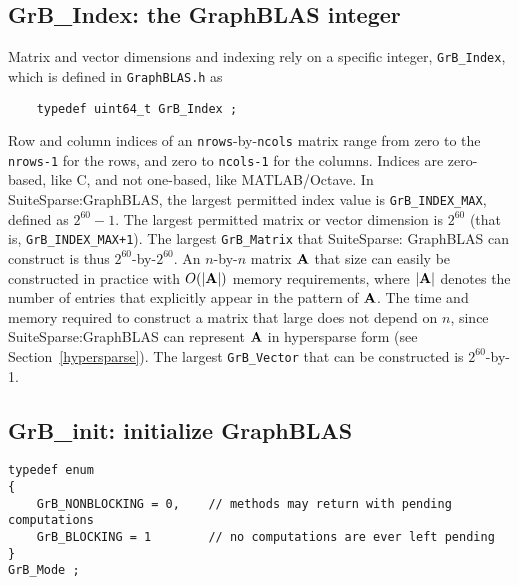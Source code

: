 \documentclass[12pt]{article}
\begin{document}
\subsection{{\sf GrB\_Index:} the GraphBLAS integer} %
\label{grbindex}

Matrix and vector dimensions and indexing rely on a specific integer,
\verb'GrB_Index', which is defined in \verb'GraphBLAS.h' as

    {\footnotesize
    \begin{verbatim}
    typedef uint64_t GrB_Index ; \end{verbatim}}

Row and column indices of an \verb'nrows'-by-\verb'ncols' matrix range from
zero to the \verb'nrows-1' for the rows, and zero to \verb'ncols-1' for the
columns.  Indices are zero-based, like C, and not one-based, like
MATLAB/Octave.  In SuiteSparse:GraphBLAS, the largest permitted index value
is \verb'GrB_INDEX_MAX', defined as $2^{60}-1$.  The largest permitted
matrix or vector dimension is $2^{60}$ (that is, \verb'GrB_INDEX_MAX+1').
The largest \verb'GrB_Matrix' that
SuiteSparse: GraphBLAS can construct is thus $2^{60}$-by-$2^{60}$.  An
$n$-by-$n$ matrix $\bf A$ that size can easily be constructed in practice with
$O(|{\bf A}|)$ memory requirements, where $|{\bf A}|$ denotes the number of
entries that explicitly appear in the pattern of ${\bf A}$.  The time and
memory required to construct a matrix that large does not depend on $n$, since
SuiteSparse:GraphBLAS can represent ${\bf A}$ in hypersparse form (see
Section~\ref{hypersparse}).  The largest \verb'GrB_Vector' that can be
constructed is $2^{60}$-by-1.

\subsection{{\sf GrB\_init:} initialize GraphBLAS} %
\label{init}

\begin{mdframed}[userdefinedwidth=6in]
{\footnotesize
\begin{verbatim}
typedef enum
{
    GrB_NONBLOCKING = 0,    // methods may return with pending computations
    GrB_BLOCKING = 1        // no computations are ever left pending
}
GrB_Mode ;
\end{verbatim}
}\end{mdframed}
\end{document}
